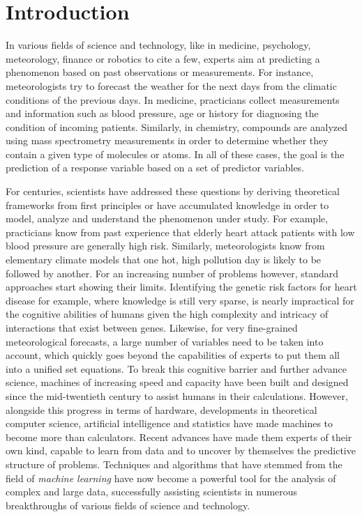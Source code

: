 \chapter{Introduction}\label{ch:introduction}

In various fields of science and technology, like in medicine, psychology,
meteorology, finance or robotics to cite a few, experts aim at predicting a
phenomenon based on past observations or measurements. For instance,
meteorologists try to forecast the weather for the next days from the climatic
conditions of the previous days. In medicine, practicians collect measurements
and information such as blood pressure, age or history for diagnosing the
condition of incoming patients. Similarly, in chemistry, compounds are analyzed
using mass spectrometry measurements in order to determine whether they contain
a given type of molecules or atoms. In all of these cases, the goal is
the prediction of a response variable based on a set of predictor
variables.

For centuries, scientists have addressed these questions by deriving
theoretical frameworks from first principles or have accumulated knowledge in
order to model, analyze and understand the pheno\-menon under study. For
example, practicians know from past experience that elderly heart attack
patients with low blood pressure are generally high risk. Similarly,
meteorologists know from elementary climate models that one hot, high pollution
day is likely to be followed by another. For an increasing number of problems
however, standard approaches start showing their limits. Identifying the
genetic risk factors for heart disease for example, where knowledge is still
very sparse, is nearly impractical for the cognitive abilities of humans given
the high complexity and intricacy of interactions that exist between genes.
Likewise, for very fine-grained meteorological forecasts, a large number of
variables need to be taken into account, which quickly goes beyond the
capabilities of experts to put them all into a unified set equations. To break
this cognitive barrier and further advance science, machines of increasing
speed and capacity have been built and designed since the mid-twentieth century
to assist humans in their calculations. However, alongside this progress in
terms of hardware, developments in theoretical computer science, artificial
intelligence and statistics have made machines to become more than calculators.
Recent advances have made them experts of their own kind, capable to learn from
data and to uncover by themselves the predictive structure of problems.
Techniques and algorithms that have stemmed from the field of {\it machine
learning} have now become a powerful tool for the analysis of complex and large
data, successfully assisting scientists in numerous breakthroughs of various
fields of science and technology.


